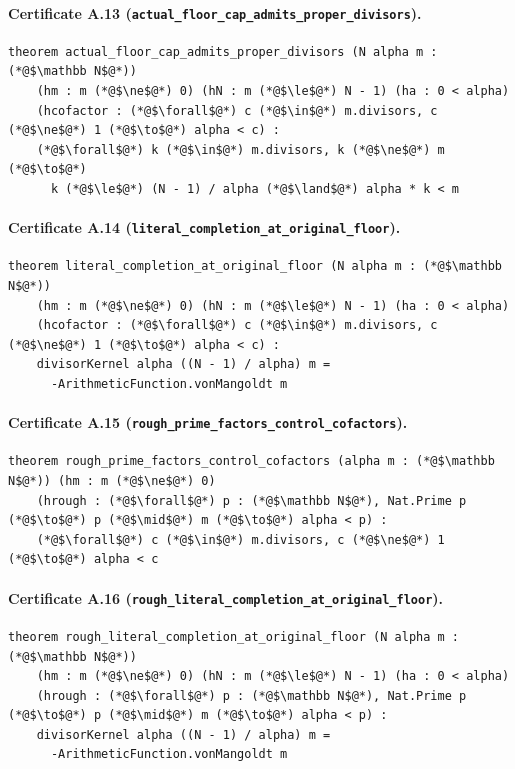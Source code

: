 \documentclass[11pt,a4paper]{article}
\theoremstyle{definition}
\theoremstyle{remark}
\begin{document}
\paragraph{Certificate A.13 (\texttt{actual\_floor\_cap\_admits\_proper\_divisors}).}
\begin{lstlisting}
theorem actual_floor_cap_admits_proper_divisors (N alpha m : (*@$\mathbb N$@*))
    (hm : m (*@$\ne$@*) 0) (hN : m (*@$\le$@*) N - 1) (ha : 0 < alpha)
    (hcofactor : (*@$\forall$@*) c (*@$\in$@*) m.divisors, c (*@$\ne$@*) 1 (*@$\to$@*) alpha < c) :
    (*@$\forall$@*) k (*@$\in$@*) m.divisors, k (*@$\ne$@*) m (*@$\to$@*)
      k (*@$\le$@*) (N - 1) / alpha (*@$\land$@*) alpha * k < m
\end{lstlisting}

\paragraph{Certificate A.14 (\texttt{literal\_completion\_at\_original\_floor}).}
\begin{lstlisting}
theorem literal_completion_at_original_floor (N alpha m : (*@$\mathbb N$@*))
    (hm : m (*@$\ne$@*) 0) (hN : m (*@$\le$@*) N - 1) (ha : 0 < alpha)
    (hcofactor : (*@$\forall$@*) c (*@$\in$@*) m.divisors, c (*@$\ne$@*) 1 (*@$\to$@*) alpha < c) :
    divisorKernel alpha ((N - 1) / alpha) m =
      -ArithmeticFunction.vonMangoldt m
\end{lstlisting}

\paragraph{Certificate A.15 (\texttt{rough\_prime\_factors\_control\_cofactors}).}
\begin{lstlisting}
theorem rough_prime_factors_control_cofactors (alpha m : (*@$\mathbb N$@*)) (hm : m (*@$\ne$@*) 0)
    (hrough : (*@$\forall$@*) p : (*@$\mathbb N$@*), Nat.Prime p (*@$\to$@*) p (*@$\mid$@*) m (*@$\to$@*) alpha < p) :
    (*@$\forall$@*) c (*@$\in$@*) m.divisors, c (*@$\ne$@*) 1 (*@$\to$@*) alpha < c
\end{lstlisting}

\paragraph{Certificate A.16 (\texttt{rough\_literal\_completion\_at\_original\_floor}).}
\begin{lstlisting}
theorem rough_literal_completion_at_original_floor (N alpha m : (*@$\mathbb N$@*))
    (hm : m (*@$\ne$@*) 0) (hN : m (*@$\le$@*) N - 1) (ha : 0 < alpha)
    (hrough : (*@$\forall$@*) p : (*@$\mathbb N$@*), Nat.Prime p (*@$\to$@*) p (*@$\mid$@*) m (*@$\to$@*) alpha < p) :
    divisorKernel alpha ((N - 1) / alpha) m =
      -ArithmeticFunction.vonMangoldt m
\end{lstlisting}
\end{document}
